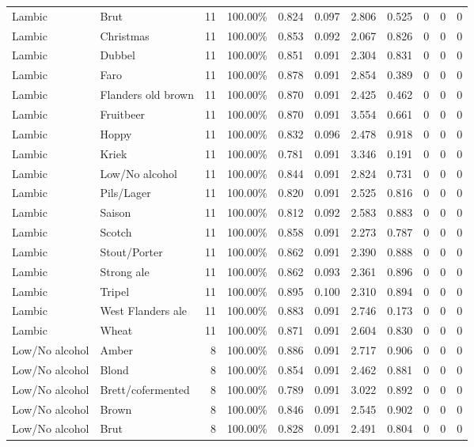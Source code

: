 {\begin{longtable}{llrrrrrrrrr}
Lambic & Brut & 11 & 100.00\% & 0.824 & 0.097 & 2.806 & 0.525 & 0 & 0 & 0 \\
Lambic & Christmas & 11 & 100.00\% & 0.853 & 0.092 & 2.067 & 0.826 & 0 & 0 & 0 \\
Lambic & Dubbel & 11 & 100.00\% & 0.851 & 0.091 & 2.304 & 0.831 & 0 & 0 & 0 \\
Lambic & Faro & 11 & 100.00\% & 0.878 & 0.091 & 2.854 & 0.389 & 0 & 0 & 0 \\
Lambic & Flanders old brown & 11 & 100.00\% & 0.870 & 0.091 & 2.425 & 0.462 & 0 & 0 & 0 \\
Lambic & Fruitbeer & 11 & 100.00\% & 0.870 & 0.091 & 3.554 & 0.661 & 0 & 0 & 0 \\
Lambic & Hoppy & 11 & 100.00\% & 0.832 & 0.096 & 2.478 & 0.918 & 0 & 0 & 0 \\
Lambic & Kriek & 11 & 100.00\% & 0.781 & 0.091 & 3.346 & 0.191 & 0 & 0 & 0 \\
Lambic & Low/No alcohol & 11 & 100.00\% & 0.844 & 0.091 & 2.824 & 0.731 & 0 & 0 & 0 \\
Lambic & Pils/Lager & 11 & 100.00\% & 0.820 & 0.091 & 2.525 & 0.816 & 0 & 0 & 0 \\
Lambic & Saison & 11 & 100.00\% & 0.812 & 0.092 & 2.583 & 0.883 & 0 & 0 & 0 \\
Lambic & Scotch & 11 & 100.00\% & 0.858 & 0.091 & 2.273 & 0.787 & 0 & 0 & 0 \\
Lambic & Stout/Porter & 11 & 100.00\% & 0.862 & 0.091 & 2.390 & 0.888 & 0 & 0 & 0 \\
Lambic & Strong ale & 11 & 100.00\% & 0.862 & 0.093 & 2.361 & 0.896 & 0 & 0 & 0 \\
Lambic & Tripel & 11 & 100.00\% & 0.895 & 0.100 & 2.310 & 0.894 & 0 & 0 & 0 \\
Lambic & West Flanders ale & 11 & 100.00\% & 0.883 & 0.091 & 2.746 & 0.173 & 0 & 0 & 0 \\
Lambic & Wheat & 11 & 100.00\% & 0.871 & 0.091 & 2.604 & 0.830 & 0 & 0 & 0 \\
Low/No alcohol & Amber & 8 & 100.00\% & 0.886 & 0.091 & 2.717 & 0.906 & 0 & 0 & 0 \\
Low/No alcohol & Blond & 8 & 100.00\% & 0.854 & 0.091 & 2.462 & 0.881 & 0 & 0 & 0 \\
Low/No alcohol & Brett/cofermented & 8 & 100.00\% & 0.789 & 0.091 & 3.022 & 0.892 & 0 & 0 & 0 \\
Low/No alcohol & Brown & 8 & 100.00\% & 0.846 & 0.091 & 2.545 & 0.902 & 0 & 0 & 0 \\
Low/No alcohol & Brut & 8 & 100.00\% & 0.828 & 0.091 & 2.491 & 0.804 & 0 & 0 & 0 \\

\end{longtable}}
